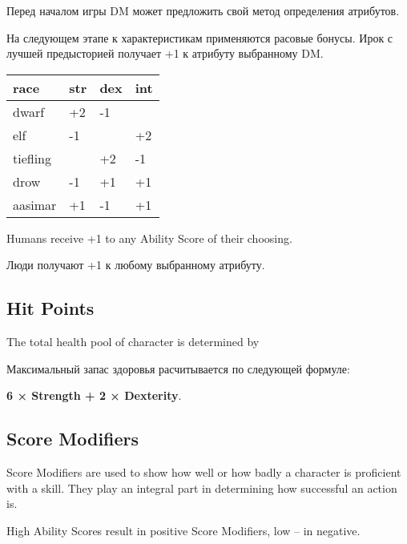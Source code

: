 \documentclass[a5paper,11pt]{book}
\begin{document}
\begin{multicols}{2}
\begin{ru}
Перед началом игры DM может предложить свой метод определения атрибутов.

На следующем этапе к характеристикам применяются расовые бонусы. Ирок с лучшей предысторией получает +1 к атрибуту выбранному DM.
\end{ru}

\smallskip
\noindent
{}
\setlength\tabcolsep{0pt}
\begin{tabularx}{\linewidth}{@{}ZYYY@{}}
  \textbf{race} & \textbf{str} & \textbf{dex} & \textbf{int} \\
  \hline
  dwarf     & +2 & -1 &    \\
  elf       & -1 &    & +2 \\
  tiefling  &    & +2 & -1 \\
  drow      & -1 & +1 & +1 \\
  aasimar   & +1 & -1 & +1
\end{tabularx}
\smallskip

\begin{en}
Humans receive +1 to any Ability Score of their choosing.
\end{en}

\begin{ru}
Люди получают +1 к любому выбранному атрибуту.
\end{ru}

\subsection{Hit Points}
\begin{en}
The total health pool of character is determined by
\end{en}

\begin{ru}
Максимальный запас здоровья расчитывается по следующей формуле:
\end{ru}
\textbf{6 × Strength + 2 × Dexterity}.

\subsection{Score Modifiers}
\begin{en}
Score Modifiers are used to show how well or how badly a character is proficient with a skill. They play an integral part in determining how successful an action is.

High Ability Scores result in positive Score Modifiers, low -- in negative.
\end{en}


\end{multicols}
\end{document}
